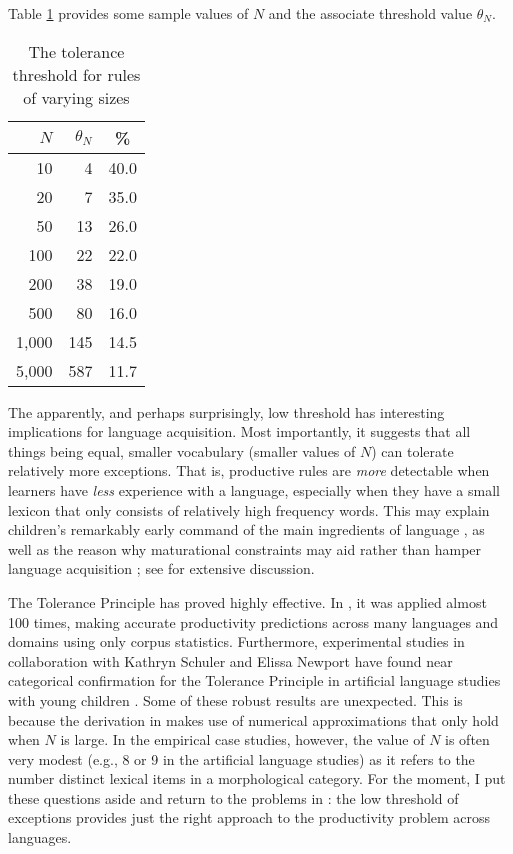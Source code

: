 \documentclass[output=paper,
modfonts
]{LSP/langsci}
\begin{document}
Table \ref{t:tolerance} provides some sample values of $N$ and the
associate threshold value $\theta_N$.  

\begin{table}[h!]
\begin{center}
\caption{The tolerance threshold for rules of varying sizes}
\label{t:tolerance}

\vspace{0.2in}
\begin{tabular}{|r|r|c|}\hline
$N$    & $\theta_{N}$  & \%\\  \hline
    10 & 4     & 40.0\\
    20 & 7     & 35.0\\
    50 & 13    & 26.0\\
   100 & 22    & 22.0 \\
   200 & 38    & 19.0 \\
   500 & 80    & 16.0\\
 1,000 & 145   & 14.5\\
 5,000 & 587   & 11.7\\ \hline
\end{tabular}
\end{center}
\end{table}

The apparently, and perhaps  surprisingly, low threshold has
interesting implications for language acquisition. Most 
importantly, it suggests that all things being equal,  smaller
vocabulary (smaller values of $N$) can tolerate relatively more
exceptions. That is, productive rules are \textit{more} detectable
when  learners have \textit{less} experience with a language, especially
when they have a small lexicon that only consists of relatively high
frequency words.  This may  explain children's
remarkably early command of the main ingredients of language
\citep{Yang2013}, as well as the reason  why maturational constraints
may aid rather than hamper language acquisition \citep{Newport1990};
see \citealt[][Chapter 7]{POP} for extensive discussion. 

The Tolerance Principle has
proved highly effective. In  \citep{POP}, it was applied almost 100
times, making accurate productivity predictions across many languages and
domains using only corpus statistics. Furthermore,
experimental studies in collaboration with Kathryn Schuler
and Elissa Newport have found near categorical confirmation for the
Tolerance Principle in artificial language studies with young children
\citep{Schuler2016}. 
Some of these robust results are unexpected. 
This is because the derivation in   makes use of
numerical approximations that only hold when $N$ is large. In
the empirical case studies, however, the value of $N$ is often very
modest (e.g., 8 or 9 in the artificial language studies) as it refers to the number 
 distinct lexical items in a morphological category. 
For the moment, I put these questions aside and 
return to  the problems in : the low threshold of exceptions provides just the right approach to the
productivity problem across languages.  
\end{document}
